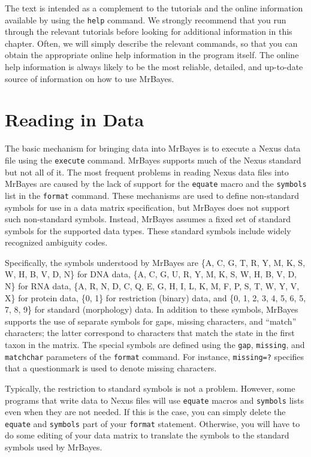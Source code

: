 \documentclass[12pt]{book}
\begin{document}
The text is intended as a complement to the tutorials and the online information available by using
the \texttt{help} command. We strongly recommend that you run through the relevant tutorials before
looking for additional information in this chapter. Often, we will simply describe the relevant
commands, so that you can obtain the appropriate online help information in the program itself. The
online help information is always likely to be the most reliable, detailed, and up-to-date source
of information on how to use MrBayes.

\section{Reading in Data}

The basic mechanism for bringing data into MrBayes is to execute a Nexus data file using the
\texttt{execute} command. MrBayes supports much of the Nexus standard \citep{Maddison97} but not
all of it. The most frequent problems in reading Nexus data files into MrBayes are caused by the
lack of support for the \texttt{equate} macro and the \texttt{symbols} list in the \texttt{format}
command. These mechanisms are used to define non-standard symbols for use in a data matrix
specification, but MrBayes does not support such non-standard symbols. Instead, MrBayes assumes a
fixed set of standard symbols for the supported data types. These standard symbols include widely
recognized ambiguity codes.

Specifically, the symbols understood by MrBayes are  \{A, C, G, T, R, Y, M, K, S, W, H, B, V, D,
N\} for DNA data, \{A, C, G, U, R, Y, M, K, S, W, H, B, V, D, N\} for RNA data, \{A, R, N, D, C, Q,
E, G, H, I, L, K, M, F, P, S, T, W, Y, V, X\} for protein data, \{0, 1\} for restriction (binary)
data, and \{0, 1, 2, 3, 4, 5, 6, 5, 7, 8, 9\} for standard (morphology) data. In addition to these
symbols, MrBayes supports the use of separate symbols for gaps, missing characters, and ``match''
characters; the latter correspond to characters that match the state in the first taxon in the
matrix. The special symbols are defined using the \texttt{gap}, \texttt{missing}, and
\texttt{matchchar} parameters of the \texttt{format} command. For instance, \texttt{missing=?}
specifies that a questionmark is used to denote missing characters.

Typically, the restriction to standard symbols is not a problem. However, some programs that write
data to Nexus files will use \texttt{equate} macros and \texttt{symbols} lists even when they are
not needed. If this is the case, you can simply delete the \texttt{equate} and \texttt{symbols}
part of your \texttt{format} statement. Otherwise, you will have to do some editing of your data
matrix to translate the symbols to the standard symbols used by MrBayes.
\end{document}
